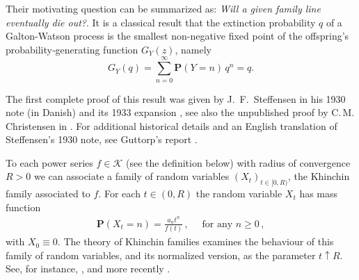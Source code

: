 \documentclass[11pt,a4paper,leqno]{amsart}
\theoremstyle{plain}
\theoremstyle{definition}
\numberwithin{equation}{section}
\def\P{\mathbf{P}}
\def\K{\mathcal{K}}
\begin{document}
		 Their motivating question can be summarized as: \textit{Will a given family line eventually die out?}. It is a classical result that the extinction probability $q$ of a Galton-Watson process is the smallest non-negative fixed point of the offspring’s probability‐generating function $G_Y(z)$, namely
		\[
		G_Y(q)
		= \sum_{n=0}^\infty \P(Y=n)\,q^n
		= q.
		\]
		
		The first complete proof of this result was given by J.~F.~Steffensen in his 1930 note \cite{Steffensen1930} (in Danish) and its 1933 expansion \cite{Steffensen1933}, see also the unpublished proof by C.\,M. Christensen in \cite{Guttorp1992}. For additional historical details and an English translation of Steffensen’s 1930 note, see Guttorp’s report \cite{Guttorp1992}.
		  \clearpage
	\endgroup
		
	\newpage
To each power series  $f \in \K$ (see the definition below) with radius of convergence $R>0$ we can associate a family of random variables $(X_t)_{t \in [0,R)}$, the Khinchin family associated to $f$. For each $t \in (0,R)$ the random variable $X_t$ has mass function
	\begin{align*}
	\P(X_t = n) = \frac{a_n t^n}{f(t)}\,, \quad \text{ for any } n \geq 0\,,
	\end{align*}
	with $X_0 \equiv 0$. The theory of Khinchin families examines the behaviour of this family of random variables, and its normalized version, as the parameter $t \uparrow R$. See, for instance, \cite{CFFM1, CFFM2, CFFM3, K_dos}, and more recently \cite{MaciaThesis, MaciaGaussian}.
	\smallskip
	

	
	
\end{document}

